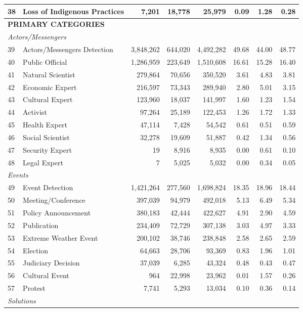 {\begin{longtable}{p{0.5cm}p{5.5cm}rrrrrr}
38 & Loss of Indigenous Practices & 7,201 & 18,778 & 25,979 & 0.09 & 1.28 & 0.28 \\
\midrule
\multicolumn{8}{l}{\cellcolor{gray!10}\textbf{PRIMARY CATEGORIES}} \\
\midrule
\multicolumn{8}{l}{\textit{Actors/Messengers}} \\
39 & Actors/Messengers Detection & 3,848,262 & 644,020 & 4,492,282 & 49.68 & 44.00 & 48.77 \\
40 & Public Official & 1,286,959 & 223,649 & 1,510,608 & 16.61 & 15.28 & 16.40 \\
41 & Natural Scientist & 279,864 & 70,656 & 350,520 & 3.61 & 4.83 & 3.81 \\
42 & Economic Expert & 216,597 & 73,343 & 289,940 & 2.80 & 5.01 & 3.15 \\
43 & Cultural Expert & 123,960 & 18,037 & 141,997 & 1.60 & 1.23 & 1.54 \\
44 & Activist & 97,264 & 25,189 & 122,453 & 1.26 & 1.72 & 1.33 \\
45 & Health Expert & 47,114 & 7,428 & 54,542 & 0.61 & 0.51 & 0.59 \\
46 & Social Scientist & 32,278 & 19,609 & 51,887 & 0.42 & 1.34 & 0.56 \\
47 & Security Expert & 19 & 8,916 & 8,935 & 0.00 & 0.61 & 0.10 \\
48 & Legal Expert & 7 & 5,025 & 5,032 & 0.00 & 0.34 & 0.05 \\
\midrule
\multicolumn{8}{l}{\textit{Events}} \\
49 & Event Detection & 1,421,264 & 277,560 & 1,698,824 & 18.35 & 18.96 & 18.44 \\
50 & Meeting/Conference & 397,039 & 94,979 & 492,018 & 5.13 & 6.49 & 5.34 \\
51 & Policy Announcement & 380,183 & 42,444 & 422,627 & 4.91 & 2.90 & 4.59 \\
52 & Publication & 234,409 & 72,729 & 307,138 & 3.03 & 4.97 & 3.33 \\
53 & Extreme Weather Event & 200,102 & 38,746 & 238,848 & 2.58 & 2.65 & 2.59 \\
54 & Election & 64,663 & 28,706 & 93,369 & 0.83 & 1.96 & 1.01 \\
55 & Judiciary Decision & 37,039 & 6,285 & 43,324 & 0.48 & 0.43 & 0.47 \\
56 & Cultural Event & 964 & 22,998 & 23,962 & 0.01 & 1.57 & 0.26 \\
57 & Protest & 7,741 & 5,293 & 13,034 & 0.10 & 0.36 & 0.14 \\
\midrule
\multicolumn{8}{l}{\textit{Solutions}} \\

\end{longtable}}

